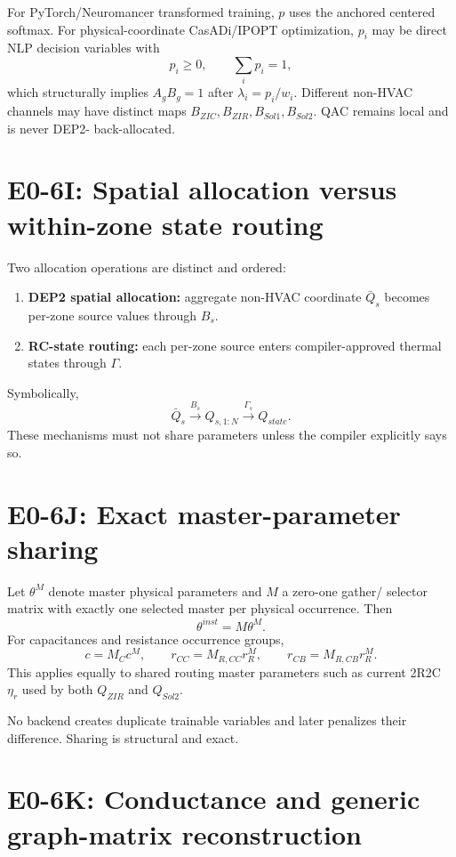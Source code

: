 \documentclass[11pt]{article}
\begin{document}
For PyTorch/Neuromancer transformed training, $p$ uses the anchored centered
softmax. For physical-coordinate CasADi/IPOPT optimization, $p_i$ may be direct
NLP decision variables with
\[
\boxed{p_i\ge0,\qquad\sum_i p_i=1,}
\]
which structurally implies $A_gB_g=1$ after $\lambda_i=p_i/w_i$.
Different non-HVAC channels may have distinct maps
$B_{ZIC},B_{ZIR},B_{Sol1},B_{Sol2}$. QAC remains local and is never DEP2-
back-allocated.

\section{E0-6I: Spatial allocation versus within-zone state routing}

Two allocation operations are distinct and ordered:
\begin{enumerate}[leftmargin=*]
\item \textbf{DEP2 spatial allocation:} aggregate non-HVAC coordinate $\bar Q_s$
becomes per-zone source values through $B_s$.
\item \textbf{RC-state routing:} each per-zone source enters compiler-approved
thermal states through $\Gamma$.
\end{enumerate}
Symbolically,
\[
\bar Q_s\xrightarrow{B_s}Q_{s,1:N}
\xrightarrow{\Gamma_s}Q_{state}.
\]
These mechanisms must not share parameters unless the compiler explicitly says
so.

\section{E0-6J: Exact master-parameter sharing}

Let $\theta^M$ denote master physical parameters and $M$ a zero-one gather/
selector matrix with exactly one selected master per physical occurrence. Then
\[
\boxed{\theta^{inst}=M\theta^M.}
\]
For capacitances and resistance occurrence groups,
\[
c=M_Cc^M,\qquad
r_{CC}=M_{R,CC}r_R^M,\qquad
r_{CB}=M_{R,CB}r_R^M.
\]
This applies equally to shared routing master parameters such as current 2R2C
$\eta_r$ used by both $Q_{ZIR}$ and $Q_{Sol2}$.

No backend creates duplicate trainable variables and later penalizes their
difference. Sharing is structural and exact.

\section{E0-6K: Conductance and generic graph-matrix reconstruction}
\end{document}
